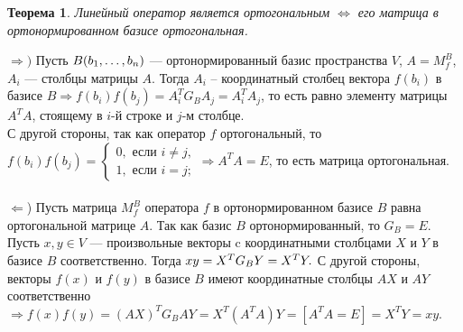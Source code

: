 \newtheorem*{th14_5_2}{Теорема}\begin{th14_5_2}Линейный оператор является ортогональным $\Longleftrightarrow$ его матрица в ортонормированном базисе ортогональная.
\end{th14_5_2}\begin{Proof} $\Rightarrow)$ Пусть $B(b_1,\dots,b_n)$ --- ортонормированный базис пространства $V$, $A = M_{f}^B$, $A_i$ --- столбцы матрицы $A$. Тогда $A_i$ -- координатный столбец вектора $f(b_i)$ в базисе $B \Rightarrow f(b_i)f(b_j) = A_i^TG_BA_j = A_i^TA_j$, то есть равно элементу матрицы $A^TA$, стоящему в $i$-й строке и $j$-м столбце.\\ С другой стороны, так как оператор $f$ ортогональный, то $f(b_i)f(b_j)=
	\begin{cases}
		0,\text{ если } i \neq j,\\
		1,\text{ если } i = j;
	\end{cases} \Rightarrow A^TA = E$, то есть матрица ортогональная.\\\\
	$\Leftarrow$) Пусть матрица $M^B_f$ оператора $f$ в ортонормированном базисе $B$ равна ортогональной матрице $A$. Так как базис $B$ ортонормированный, то $G_B = E$. \\Пусть $x, y \in V$ --- произвольные векторы c координатными столбцами $X$ и $Y$ в базисе $B$ соответственно. Тогда $xy = X^TG_BY = X^TY.\\$
	С другой стороны, векторы $f(x)$ и $f(y)$ в базисе $B$ имеют координатные столбцы $AX$ и $AY$ соответственно $\Rightarrow f(x) f(y) = (AX)^TG_BAY = X^T(A^TA)Y=[A^TA=E] = X^TY = xy$.
\end{Proof}














